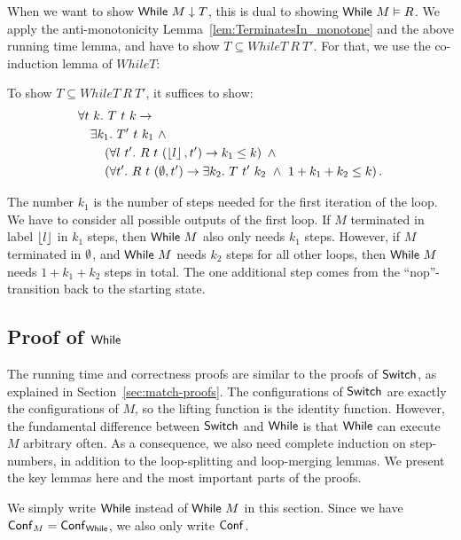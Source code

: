 When we want to show $\mathsf{While}~M \mathrel{\downarrow} T$, this is dual to showing $\mathsf{While}~M \mathrel{\vDash} R$.  We apply the anti-monotonicity
Lemma~\ref{lem:TerminatesIn_monotone} and the above running time lemma, and have to show $T \subseteq WhileT~R~T'$.  For that, we use the co-induction
lemma of $WhileT$:
\begin{lemma}
  \label{lem:WhileCoInduction}
  To show $T \subseteq WhileT~R~T'$, it suffices to show:
  \begin{alignat*}{1}
    &\forall t~k.~T~t~k \rightarrow \\
    &\quad \exists k_1.~T'~t~k_1 ~\land~ \\
    &\quad\quad \left( \forall l~t'.~R~t~(\left\lfloor {l} \right\rfloor, t') \rightarrow k_1 \leq k \right) ~\land~ \\
    &\quad\quad \left( \forall t'.~R~t~(\emptyset, t') \rightarrow \exists k_2.~T~t'~k_2 ~\land~ 1+k_1+k_2 \leq k \right).
  \end{alignat*}
\end{lemma}
The number $k_1$ is the number of steps needed for the first iteration of the loop.  We have to consider all possible outputs of the first loop.  If
$M$ terminated in label $\left\lfloor {l} \right\rfloor$ in $k_1$ steps, then $\mathsf{While}~M$ also only needs $k_1$ steps.  However, if $M$ terminated in $\emptyset$, and $\mathsf{While}~M$
needs $k_2$ steps for all other loops, then $\mathsf{While}~M$ needs $1+k_1+k_2$ steps in total.  The one additional step comes from the ``nop''-transition
back to the starting state.



\subsection{Proof of $\mathsf{While}$}
\label{sec:while-proofs}

The running time and correctness proofs are similar to the proofs of $\mathsf{Switch}$, as explained in Section~\ref{sec:match-proofs}.  The configurations of
$\mathsf{Switch}$ are exactly the configurations of $M$, so the lifting function is the identity function.  However, the fundamental difference between
$\mathsf{Switch}$ and $\mathsf{While}$ is that $\mathsf{While}$ can execute $M$ arbitrary often.  As a consequence, we also need complete induction on step-numbers, in
addition to the loop-splitting and loop-merging lemmas.  We present the key lemmas here and the most important parts of the proofs.

We simply write $\mathsf{While}$ instead of $\mathsf{While}~M$ in this section.  Since we have $\mathsf{Conf}_M = \mathsf{Conf}_{\mathsf{While}}$, we also only write $\mathsf{Conf}$.

